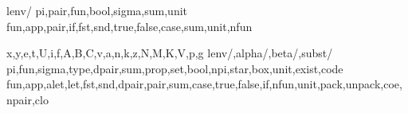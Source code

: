 \makeatother

\newcommand{\len}[1]{|#1|}
\newtheorem*{digression}{Digression}
\newtheorem*{typographical}{Typographical Note}


\newcommand{\gfont}{\mathrm}
\newcommand{\gfonttext}{\nop}
\newcommand{\gfontsym}{\nop}
\newcommand{\gcolor}{\nop}
\newlanguage{\gcolor}{\gfont}{\gfontsym}{g}
{}
{lenv/\Gamma}
{pi,pair,fun,bool,sigma,sum,unit}
{fun,app,pair,if,fst,snd,true,false,case,sum,unit,nfun}


\newcommand{\gFalse}{\False}
\newcommand{\ginje}{\gsume}

\newcommand{\gjudg}{\judg}

\newcommand{\model}[1]{\sembrace{#1}^\circ}


\renewcommand{\slang}{ECC\xspace}
\renewcommand{\scolor}[1]{\mathcolor{RoyalBlue}{#1}}

{x,y,e,t,U,i,f,A,B,C,v,a,n,k,z,N,M,K,V,p,g}
{lenv/\Gamma,alpha/\alpha,beta/\beta,subst/\gamma}
{pi,fun,sigma,type,dpair,sum,prop,set,bool,npi,star,box,unit,exist,code}
{fun,app,alet,let,fst,snd,dpair,pair,sum,case,true,false,if,nfun,unit,pack,unpack,coe,npair,clo}

\newcommand{\sinje}{\ssume}

\renewcommand{\step}{\vartriangleright}
\renewcommand{\stepstar}{\step^*}

\newcommand{\subtypesym}{\preceq}
\newcommand{\sstepjudg}[4][\step]{\wf{#2}{#3\mathbin{#1}#4}}
\newcommand{\sequivjudg}[3]{\wf{#1}{#2\mathbin{\equiv}#3}}
\newcommand{\ssubtyjudg}[3]{\wf{#1}{#2\mathbin{\subtypesym}#3}}
\newcommand{\styjudg}[3]{\judg{#1}{#2}{#3}}
\newcommand{\swf}[1]{\wf{}{#1}}

\newcommand{\ecceqv}[4]{\judg{#1}{#2 \approx #3}{#4}}

\newcommand{\seval}[1]{\sfont{eval}(#1)}

\newcommand{\ssubstok}{\wf}

\newcommand{\cpsslang}{CoC$^{D}$\xspace}
\newcommand{\eccidk}{\sfont{id}}
\newcommand{\cps}{CoC$^{k}$}
\newcommand{\cpstlang}{\cps\xspace}
\newcommand{\cpsprime}{\tprime}

